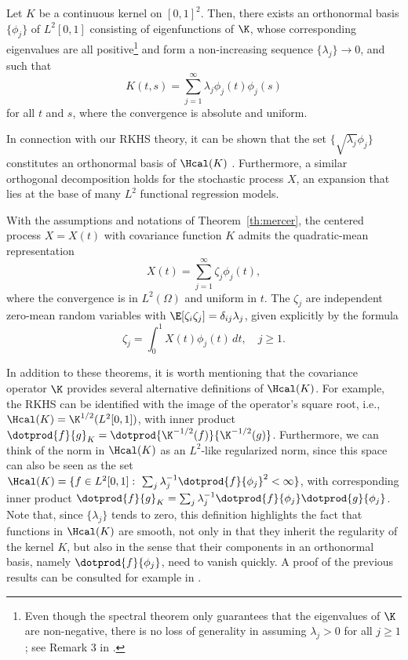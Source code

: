 \begin{theorem}\label{th:mercer}
    Let \(K\) be a continuous kernel on \([0,1]^2\). Then, there exists an orthonormal basis \(\{\phi_j\}\) of \(L^2[0,1]\) consisting of eigenfunctions of \(\K\), whose corresponding eigenvalues are all positive\footnote{Even though the spectral theorem only guarantees that the eigenvalues of \(\K\) are non-negative, there is no loss of generality in assuming \(\lambda_j> 0\) for all \(j\geq 1\); see Remark 3 in \citet[Ch.~3]{cucker2001mathematical}.} and form a non-increasing sequence \(\{\lambda_j\}\to 0\), and such that
    \[
      K(t, s) = \sum_{j=1}^\infty \lambda_j \phi_j(t)\phi_j(s)
    \]
    for all \(t\) and \(s\), where the convergence is absolute and uniform.
\end{theorem}

In connection with our RKHS theory, it can be shown that the set \(\{\sqrt{\lambda_j}\phi_j\}\) constitutes an orthonormal basis of \(\Hcal(K)\) \citep[see e.g.][Sec.~4.4]{cucker2007learning}. Furthermore, a similar orthogonal decomposition holds for the stochastic process \(X\), an expansion that lies at the base of many \(L^2\) functional regression models.

\begin{theorem}
  With the assumptions and notations of Theorem~\ref{th:mercer}, the centered process \(X=X(t)\) with covariance function \(K\) admits the quadratic-mean representation
  \[
  X(t) = \sum_{j=1}^\infty \zeta_j \phi_j(t),
  \]
  where the convergence is in \(L^2(\Omega)\) and uniform in \(t\). The \(\zeta_j\) are independent zero-mean random variables with \(\E[\zeta_i\zeta_j]=\delta_{ij}\lambda_j\), given explicitly by the formula
  \[
    \zeta_j = \int_0^1 X(t)\phi_j(t)\, dt, \quad j\geq 1.
  \]
\end{theorem}

In addition to these theorems, it is worth mentioning that the covariance operator \(\K\) provides several alternative definitions of \(\Hcal(K)\). For example, the RKHS can be identified with the image of the operator's square root, i.e., \(\Hcal(K) = \K^{1/2}(L^2[0, 1])\), with inner product \(\dotprod{f}{g}_K = \dotprod{\K^{-1/2}(f)}{\K^{-1/2}(g)}\). Furthermore, we can think of the norm in \(\Hcal(K)\) as an \(L^2\)-like regularized norm, since this space can also be seen as the set \(\Hcal(K) = \{f \in L^2[0, 1]: \ \sum_j \lambda_j^{-1}\dotprod{f}{\phi_j}^2 < \infty \}\),
with corresponding inner product \(\dotprod{f}{g}_K = \sum_j \lambda_j^{-1}\dotprod{f}{\phi_j}\dotprod{g}{\phi_j}\). Note that, since \(\{\lambda_j\}\) tends to zero, this definition highlights the fact that functions in \(\Hcal(K)\) are smooth, not only in that they inherit the regularity of the kernel \(K\), but also in the sense that their components in an orthonormal basis, namely \(\dotprod{f}{\phi_j}\), need to vanish quickly. A proof of the previous results can be consulted for example in \citet[][Sec.~3.2]{berlinet2004reproducing}.

